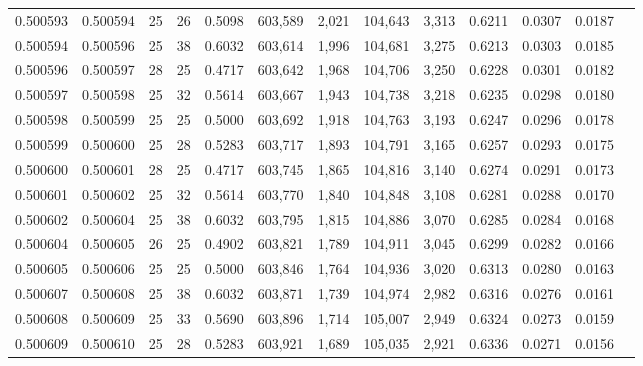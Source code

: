 \begin{tabular}{rrrrrrrrrrrrr}
0.500593 & 0.500594 &    25 &  26 &                                     0.5098 & 603,589 &   2,021 & 104,643 &   3,313 & 0.6211 & 0.0307 & 0.0187 \\
0.500594 & 0.500596 &    25 &  38 &                                     0.6032 & 603,614 &   1,996 & 104,681 &   3,275 & 0.6213 & 0.0303 & 0.0185 \\
0.500596 & 0.500597 &    28 &  25 &                                     0.4717 & 603,642 &   1,968 & 104,706 &   3,250 & 0.6228 & 0.0301 & 0.0182 \\
0.500597 & 0.500598 &    25 &  32 &                                     0.5614 & 603,667 &   1,943 & 104,738 &   3,218 & 0.6235 & 0.0298 & 0.0180 \\
0.500598 & 0.500599 &    25 &  25 &                                     0.5000 & 603,692 &   1,918 & 104,763 &   3,193 & 0.6247 & 0.0296 & 0.0178 \\
0.500599 & 0.500600 &    25 &  28 &                                     0.5283 & 603,717 &   1,893 & 104,791 &   3,165 & 0.6257 & 0.0293 & 0.0175 \\
0.500600 & 0.500601 &    28 &  25 &                                     0.4717 & 603,745 &   1,865 & 104,816 &   3,140 & 0.6274 & 0.0291 & 0.0173 \\
0.500601 & 0.500602 &    25 &  32 &                                     0.5614 & 603,770 &   1,840 & 104,848 &   3,108 & 0.6281 & 0.0288 & 0.0170 \\
0.500602 & 0.500604 &    25 &  38 &                                     0.6032 & 603,795 &   1,815 & 104,886 &   3,070 & 0.6285 & 0.0284 & 0.0168 \\
0.500604 & 0.500605 &    26 &  25 &                                     0.4902 & 603,821 &   1,789 & 104,911 &   3,045 & 0.6299 & 0.0282 & 0.0166 \\
0.500605 & 0.500606 &    25 &  25 &                                     0.5000 & 603,846 &   1,764 & 104,936 &   3,020 & 0.6313 & 0.0280 & 0.0163 \\
0.500607 & 0.500608 &    25 &  38 &                                     0.6032 & 603,871 &   1,739 & 104,974 &   2,982 & 0.6316 & 0.0276 & 0.0161 \\
0.500608 & 0.500609 &    25 &  33 &                                     0.5690 & 603,896 &   1,714 & 105,007 &   2,949 & 0.6324 & 0.0273 & 0.0159 \\
0.500609 & 0.500610 &    25 &  28 &                                     0.5283 & 603,921 &   1,689 & 105,035 &   2,921 & 0.6336 & 0.0271 & 0.0156 \\

\end{tabular}
